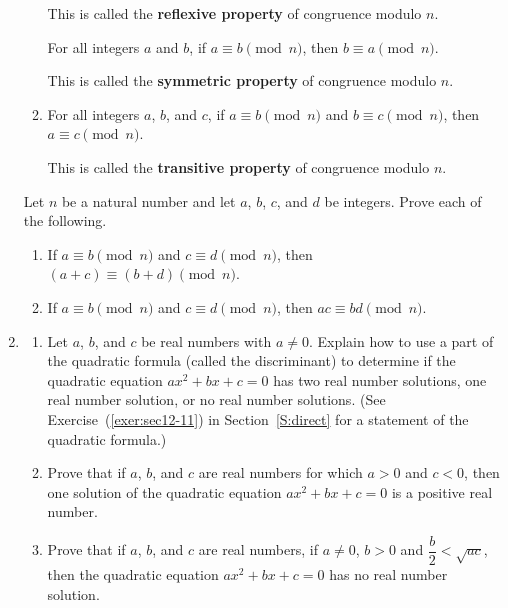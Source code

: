 \begin{enumerate}
\begin{enumerate}
This is called the \textbf{reflexive property}
%
 of congruence modulo $n$.

  \yitem For all integers $a$ and $b$, if  $a \equiv b \pmod n$, then  $b \equiv a \pmod n$.

This is called the \textbf{symmetric property} \label{exer:cong-symmetry}
%
 of congruence modulo $n$.

  \item For all integers $a$, $b$, and $c$, if  $a \equiv b \pmod n$ and $b \equiv c \pmod n$, then  
$a \equiv c \pmod n$.

This is called the \textbf{transitive property}
%
 of congruence modulo $n$.
\end{enumerate}


\xitem Let  $n$  be a natural number and let  $a$, $b$, $c$, and  $d$  be integers.  Prove each of the following.
\label{exer:sec31-11}%

  \begin{enumerate}
    \item If  $a \equiv b \pmod n$ and  $c \equiv d \pmod n$, then  \\$\left( {a + c} \right) \equiv \left( {b + d} \right) \pmod n$.
    \item If  $a \equiv b \pmod n$ and  $c \equiv d \pmod n$, then  
$ac \equiv bd \pmod n$.
\label{exer:congprops}%
  \end{enumerate}


\item  \label{exer:quadformula2} 
\begin{enumerate}
\item Let $a$, $b$, and $c$ be real numbers with $a \ne 0$.  Explain how to use a part of the quadratic formula (called the discriminant) to determine if the quadratic equation 
% 
 $ax^2 + bx + c = 0$ has two real number solutions, one real number solution, or no real number solutions.  (See Exercise~(\ref{exer:sec12-11}) in Section~\ref{S:direct} for a statement of the quadratic formula.)

\item Prove that if $a$, $b$, and $c$ are real numbers for which $a>0$ and \mbox{$c<0$}, then one solution of the quadratic equation
\mbox{$ax^2+bx+c=0$}
is a positive real number.

\item Prove that if  $a$, $b$, and  $c$  are real numbers, if  $a \ne 0$, $b > 0$ and %
\mbox{$\dfrac{b}{2} < \sqrt {ac} $}, then the quadratic equation  $ax^2  + bx + c = 0$ has no real number solution.
\end{enumerate}



\end{enumerate}
